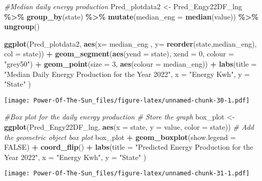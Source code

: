 \documentclass[
]{article}
\newenvironment{Shaded}{\begin{snugshade}}{\end{snugshade}}
\newcommand{\AttributeTok}[1]{\textcolor[rgb]{0.13,0.29,0.53}{#1}}
\newcommand{\CommentTok}[1]{\textcolor[rgb]{0.56,0.35,0.01}{\textit{#1}}}
\newcommand{\ConstantTok}[1]{\textcolor[rgb]{0.56,0.35,0.01}{#1}}
\newcommand{\DecValTok}[1]{\textcolor[rgb]{0.00,0.00,0.81}{#1}}
\newcommand{\FunctionTok}[1]{\textcolor[rgb]{0.13,0.29,0.53}{\textbf{#1}}}
\newcommand{\NormalTok}[1]{#1}
\newcommand{\OtherTok}[1]{\textcolor[rgb]{0.56,0.35,0.01}{#1}}
\newcommand{\SpecialCharTok}[1]{\textcolor[rgb]{0.81,0.36,0.00}{\textbf{#1}}}
\newcommand{\StringTok}[1]{\textcolor[rgb]{0.31,0.60,0.02}{#1}}
\begin{document}
\begin{Shaded}
\begin{Highlighting}[]
\CommentTok{\#Median daily energy production }
\NormalTok{Pred\_plotdata2 }\OtherTok{\textless{}{-}}\NormalTok{ Pred\_Engy22DF\_lng }\SpecialCharTok{\%\textgreater{}\%}
  \FunctionTok{group\_by}\NormalTok{(state) }\SpecialCharTok{\%\textgreater{}\%}
  \FunctionTok{mutate}\NormalTok{(}\AttributeTok{median\_eng =} \FunctionTok{median}\NormalTok{(value)) }\SpecialCharTok{\%\textgreater{}\%}
  \FunctionTok{ungroup}\NormalTok{()}

\FunctionTok{ggplot}\NormalTok{(Pred\_plotdata2, }\FunctionTok{aes}\NormalTok{(}\AttributeTok{x=}\NormalTok{ median\_eng , }
                          \AttributeTok{y=} \FunctionTok{reorder}\NormalTok{(state,median\_eng),}
                          \AttributeTok{col =}\NormalTok{ state)) }\SpecialCharTok{+}
  \FunctionTok{geom\_segment}\NormalTok{(}\FunctionTok{aes}\NormalTok{(}\AttributeTok{yend =}\NormalTok{ state), }
               \AttributeTok{xend =} \DecValTok{0}\NormalTok{, }
               \AttributeTok{colour =} \StringTok{"grey50"}\NormalTok{) }\SpecialCharTok{+}
  \FunctionTok{geom\_point}\NormalTok{(}\AttributeTok{size =} \DecValTok{3}\NormalTok{, }
             \FunctionTok{aes}\NormalTok{(}\AttributeTok{colour =}\NormalTok{ median\_eng)) }\SpecialCharTok{+}
  \FunctionTok{labs}\NormalTok{(}\AttributeTok{title =} \StringTok{"Median Daily Energy Production for the Year 2022"}\NormalTok{,}
       \AttributeTok{x =} \StringTok{"Energy Kwh"}\NormalTok{, }
       \AttributeTok{y =} \StringTok{"State"}\NormalTok{ ) }
\end{Highlighting}
\end{Shaded}

\texttt{[image: Power-Of-The-Sun\_files/figure-latex/unnamed-chunk-30-1.pdf]}

\begin{Shaded}
\begin{Highlighting}[]
\CommentTok{\#Box plot for the daily energy production }
\CommentTok{\# Store the graph}
\NormalTok{box\_plot }\OtherTok{\textless{}{-}} \FunctionTok{ggplot}\NormalTok{(Pred\_Engy22DF\_lng, }
                   \FunctionTok{aes}\NormalTok{(}\AttributeTok{x =}\NormalTok{ state, }
                       \AttributeTok{y =}\NormalTok{ value,  }
                       \AttributeTok{color =}\NormalTok{ state))}
\CommentTok{\# Add the geometric object box plot}
\NormalTok{box\_plot }\SpecialCharTok{+}
  \FunctionTok{geom\_boxplot}\NormalTok{(}\AttributeTok{show.legend =} \ConstantTok{FALSE}\NormalTok{) }\SpecialCharTok{+}
  \FunctionTok{coord\_flip}\NormalTok{() }\SpecialCharTok{+}
  \FunctionTok{labs}\NormalTok{(}\AttributeTok{title =} \StringTok{"Predicted Energy Production for the Year 2022"}\NormalTok{,}
       \AttributeTok{x =} \StringTok{"Energy Kwh"}\NormalTok{, }
       \AttributeTok{y =} \StringTok{"State"}\NormalTok{ ) }
\end{Highlighting}
\end{Shaded}

\texttt{[image: Power-Of-The-Sun\_files/figure-latex/unnamed-chunk-31-1.pdf]}
\end{document}
